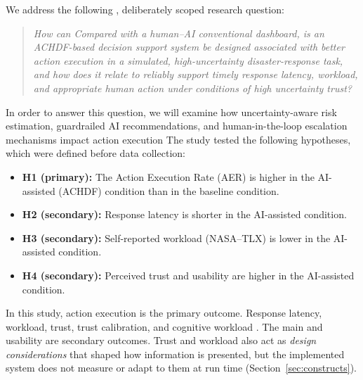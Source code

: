 \documentclass[journal]{IEEEtran}
\theoremstyle{plain}
\theoremstyle{definition}
\providecommand{\DIFaddtex}[1]{{\protect\color{blue} \sf #1}} %
\providecommand{\DIFdeltex}[1]{{\protect\color{red} \scriptsize #1}} %
\providecommand{\DIFaddbegin}{} %
\providecommand{\DIFaddend}{} %
\providecommand{\DIFdelbegin}{} %
\providecommand{\DIFdelend}{} %
\providecommand{\DIFadd}[1]{\texorpdfstring{\DIFaddtex{#1}}{#1}} %
\providecommand{\DIFdel}[1]{\texorpdfstring{\DIFdeltex{#1}}{}} %
\newcommand{\DIFscaledelfig}{0.5}
\newlength{\DIFdelgraphicswidth} %
\newlength{\DIFdelgraphicsheight} %
\newcommand{\DIFaddincludegraphics}[2][]{{\color{blue}\fbox{\DIFOincludegraphics[#1]{#2}}}} %
\newcommand{\DIFdelincludegraphics}[2][]{%
\sbox{\DIFdelgraphicsbox}{\DIFOincludegraphics[#1]{#2}}%
\settoboxwidth{\DIFdelgraphicswidth}{\DIFdelgraphicsbox} %
\settoboxtotalheight{\DIFdelgraphicsheight}{\DIFdelgraphicsbox} %
\scalebox{\DIFscaledelfig}{%
\parbox[b]{\DIFdelgraphicswidth}{\usebox{\DIFdelgraphicsbox}\\[-\baselineskip] \rule{\DIFdelgraphicswidth}{0em}}\llap{\resizebox{\DIFdelgraphicswidth}{\DIFdelgraphicsheight}{%
\setlength{\unitlength}{\DIFdelgraphicswidth}%
\begin{picture}(1,1)%
\thicklines\linethickness{2pt} %
{\color[rgb]{1,0,0}\put(0,0){\framebox(1,1){}}}%
{\color[rgb]{1,0,0}\put(0,0){\line( 1,1){1}}}%
{\color[rgb]{1,0,0}\put(0,1){\line(1,-1){1}}}%
\end{picture}%
}\hspace*{3pt}}} %
} %
\DeclareRobustCommand{\DIFaddbegin}{\DIFOaddbegin \let\includegraphics\DIFaddincludegraphics} %
\DeclareRobustCommand{\DIFaddend}{\DIFOaddend \let\includegraphics\DIFOincludegraphics} %
\DeclareRobustCommand{\DIFdelbegin}{\DIFOdelbegin \let\includegraphics\DIFdelincludegraphics} %
\DeclareRobustCommand{\DIFdelend}{\DIFOaddend \let\includegraphics\DIFOincludegraphics} %
\begin{document}
\DIFadd{We }\DIFaddend address the following\DIFaddbegin \DIFadd{, deliberately scoped }\DIFaddend research question:
\begin{quote}
    \emph{\DIFdelbegin \DIFdel{How can }\DIFdelend \DIFaddbegin \DIFadd{Compared with }\DIFaddend a \DIFdelbegin \DIFdel{human--AI }\DIFdelend \DIFaddbegin \DIFadd{conventional dashboard, is an ACHDF-based }\DIFaddend decision \DIFaddbegin \DIFadd{support }\DIFaddend system \DIFdelbegin \DIFdel{be designed }\DIFdelend \DIFaddbegin \DIFadd{associated with better action execution in a simulated, high-uncertainty disaster-response task, and how does it relate }\DIFaddend to \DIFdelbegin \DIFdel{reliably support timely }\DIFdelend \DIFaddbegin \DIFadd{response latency, workload, }\DIFaddend and \DIFdelbegin \DIFdel{appropriate human action under conditions of high uncertainty}\DIFdelend \DIFaddbegin \DIFadd{trust}\DIFaddend ?}
\end{quote}
\DIFdelbegin \DIFdel{In order to answer this question, we will examine how uncertainty-aware risk estimation, guardrailed AI recommendations, and human-in-the-loop escalation mechanisms impact action execution }\DIFdelend \DIFaddbegin \DIFadd{The study tested the following hypotheses, which were defined before data collection:
}\begin{itemize}
    \item \DIFadd{\textbf{H1 (primary):} The Action Execution Rate (AER) is higher in the AI-assisted (ACHDF) condition than in the baseline condition.
    }\item \DIFadd{\textbf{H2 (secondary):} Response latency is shorter in the AI-assisted condition.
    }\item \DIFadd{\textbf{H3 (secondary):} Self-reported workload (NASA--TLX) is lower in the AI-assisted condition.
    }\item \DIFadd{\textbf{H4 (secondary):} Perceived trust and usability are higher in the AI-assisted condition.
}\end{itemize}
\DIFadd{In this study, action execution is the primary outcome. Response latency, workload, trust}\DIFaddend , \DIFdelbegin \DIFdel{trust calibration, and cognitive workload \cite{McAllister2017IJCAI,Weidinger2022FAccT,Assaad2023TAS,Miller2019XRDS}.
The main }\DIFdelend \DIFaddbegin \DIFadd{and usability are secondary outcomes. Trust and workload also act as \emph{design considerations} that shaped how information is presented, but the implemented system does not measure or adapt to them at run time (Section~\ref{sec:constructs}).
}
\end{document}
